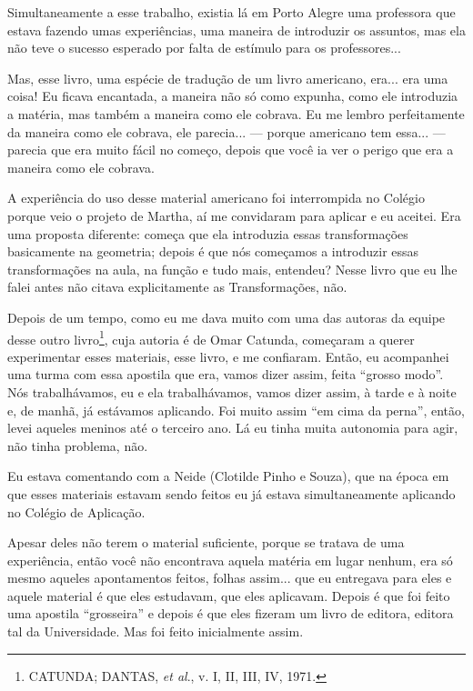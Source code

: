 \documentclass{hipatia}
\begin{document}
Simultaneamente a esse trabalho, existia lá em Porto Alegre uma
professora que estava fazendo umas experiências, uma maneira de introduzir
os assuntos, mas ela não teve o sucesso esperado por falta de estímulo
para os professores...

Mas, esse livro, uma espécie de tradução de um livro americano,
era... era uma coisa! Eu ficava encantada, a maneira não só como
expunha, como ele introduzia a matéria, mas também a maneira como ele
cobrava. Eu me lembro perfeitamente da maneira como ele cobrava, ele
parecia... --- porque americano tem essa... --- parecia que era muito
fácil no começo, depois que você ia ver o perigo que era a maneira como
ele cobrava.

A experiência do uso desse material americano foi interrompida no
Colégio porque veio o projeto de Martha, aí me convidaram para aplicar e
eu aceitei. Era uma proposta diferente: começa que ela introduzia essas
transformações basicamente na geometria; depois é que nós começamos a
introduzir essas transformações na aula, na função e tudo mais,
entendeu? Nesse livro que eu lhe falei antes não citava explicitamente
as Transformações, não.

Depois de um tempo, como eu me dava muito com uma das autoras da equipe
desse outro livro\footnote{CATUNDA; DANTAS, \emph{et al}., v. I, II,
  III, IV, 1971.}, cuja autoria é de Omar Catunda, começaram a querer
experimentar esses materiais, esse livro, e me confiaram. Então, eu
acompanhei uma turma com essa apostila que era, vamos dizer assim, feita
``grosso modo''. Nós trabalhávamos, eu e ela trabalhávamos, vamos dizer
assim, à tarde e à noite e, de manhã, já estávamos aplicando. Foi muito
assim ``em cima da perna'', então, levei aqueles meninos até o terceiro
ano. Lá eu tinha muita autonomia para agir, não tinha problema, não.

Eu estava comentando com a Neide (Clotilde Pinho e Souza), que na época
em que esses materiais estavam sendo feitos eu já estava simultaneamente
aplicando no Colégio de Aplicação.

Apesar deles não terem o material suficiente, porque se tratava de uma
experiência, então você não encontrava aquela matéria em lugar nenhum,
era só mesmo aqueles apontamentos feitos, folhas assim... que eu
entregava para eles e aquele material é que eles estudavam, que eles
aplicavam. Depois é que foi feito uma apostila ``grosseira'' e depois é
que eles fizeram um livro de editora, editora tal da Universidade. Mas
foi feito inicialmente assim.
\end{document}
